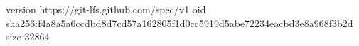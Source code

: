 version https://git-lfs.github.com/spec/v1
oid sha256:f4a8a5a6ccdbd8d7cd57a162805f1d0cc5919d5abe72234eacbd3e8a968f3b2d
size 32864
